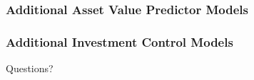 \documentclass{beamer}
\begin{document}
\begin{frame}
    \frametitle{Additional Asset Value Predictor Models}

\end{frame}

\begin{frame}
    \frametitle{Additional Investment Control Models}

\end{frame}

\begin{frame}
    \Huge{\centerline{Questions?}}
\end{frame}






\end{document}
